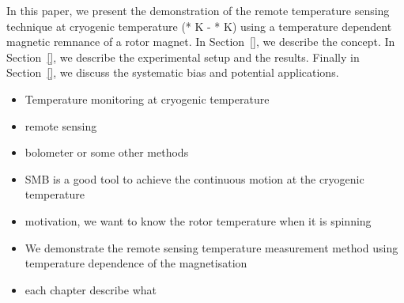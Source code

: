 In this paper, we present the demonstration of the remote temperature sensing technique at cryogenic temperature (* K - * K) using a temperature dependent magnetic remnance of a rotor magnet. In Section~\ref{}, we describe the concept. In Section~\ref{}, we describe the experimental setup and the results. Finally in Section~\ref{}, we discuss the systematic bias and potential applications.

\begin{itemize}
\item Temperature monitoring at cryogenic temperature
\item remote sensing
\item bolometer or some other methods
\item SMB is a good tool to achieve the continuous motion at the cryogenic temperature
\item motivation, we want to know the rotor temperature when it is spinning
\item We demonstrate the remote sensing temperature measurement method using temperature dependence of the magnetisation
\item each chapter describe what
\end{itemize}
